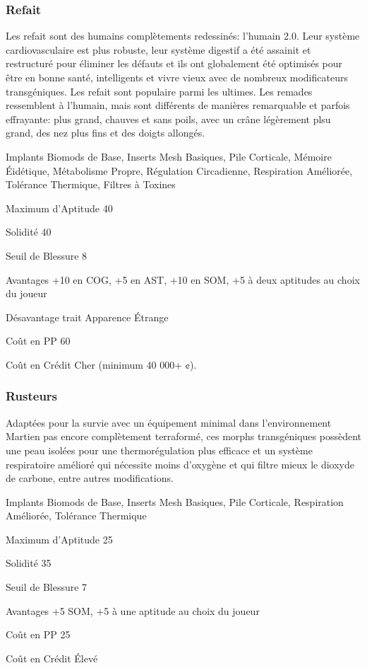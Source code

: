 \subsubsection{Refait} \label{sec:starting-remade} 

Les refait sont des humains complètements redessinés: l'humain 2.0. Leur système cardiovasculaire est plus robuste, leur système digestif a été assainit et restructuré pour éliminer les défauts et ils ont globalement été optimisés pour être en bonne santé, intelligents et vivre vieux avec de nombreux modificateurs transgéniques. Les refait sont populaire parmi les ultimes. Les remades ressemblent à l'humain, mais sont différents de manières remarquable et parfois effrayante: plus grand, chauves et sans poils, avec un crâne légèrement plsu grand, des nez plus fins et des doigts allongés. 

\begin{description*} \item[Implants] Biomods de Base, Inserts Mesh Basiques, Pile Corticale, Mémoire Éidétique, Métabolisme Propre, Régulation Circadienne, Respiration Améliorée, Tolérance Thermique, Filtres à Toxines\item[Maximum d'Aptitude] 40 \item[Solidité] 40 \item[Seuil de Blessure] 8 \item[Avantages] +10 en COG, +5 en AST, +10 en SOM, +5 à deux aptitudes au choix du joueur\item[Désavantage] trait Apparence Étrange \item[Coût en PP] 60 \item[Coût en Crédit] Cher (minimum 40 000+ ¢). \end{description*} 

\subsubsection{Rusteurs} \label{sec:starting-rusters} 

Adaptées pour la survie avec un équipement minimal dans l'environnement Martien pas encore complètement terraformé, ces morphs transgéniques possèdent une peau isolées pour une thermorégulation plus efficace et un système respiratoire amélioré qui nécessite moins d'oxygène et qui filtre mieux le dioxyde de carbone, entre autres modifications. 

\begin{description*} \item[Implants] Biomods de Base, Inserts Mesh Basiques, Pile Corticale, Respiration Améliorée, Tolérance Thermique\item[Maximum d'Aptitude] 25 \item[Solidité] 35 \item[Seuil de Blessure] 7 \item[Avantages] +5 SOM, +5 à une aptitude au choix du joueur\item[Coût en PP] 25 \item[Coût en Crédit] Élevé \end{description*} 

